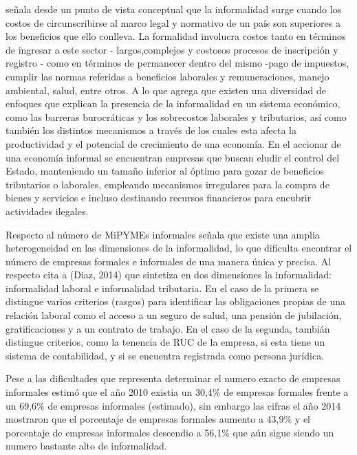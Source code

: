 \cite{loayza} se\~nala desde un punto de vista conceptual que la informalidad surge
cuando los costos de circunscribirse al marco legal y normativo de un pa\'is son
superiores a los beneficios que ello conlleva. La formalidad involucra costos
tanto en t\'erminos de ingresar a este sector - largos,complejos y costosos procesos
de inscripci\'on y registro - como en t\'erminos de permanecer dentro del mismo -pago
de impuestos, cumplir las normas referidas a beneficios laborales
y remuneraciones, manejo ambiental, salud, entre otros. A lo que \citep{penaranda}
agrega que existen una diversidad de enfoques que explican la presencia de la
informalidad en un sistema econ\'omico, como las barreras burocr\'aticas y los sobrecostos
laborales y tributarios, as\'i como tambi\'en los distintos mecanismos a trav\'es de
los cuales esta afecta la productividad y el potencial de crecimiento de una
econom\'ia. En el accionar de una econom\'ia informal se encuentran empresas que
buscan eludir el control del Estado, manteniendo un tama\~no inferior al \'optimo
para gozar de beneficios tributarios o laborales, empleando mecanismos irregulares
para la compra de bienes y servicios e incluso destinando recursos financieros
para encubrir actividades ilegales.

Respecto al n\'umero de MiPYMEs informales \cite{produce2} se\~nala que existe una
amplia heterogeneidad en las dimensiones de la informalidad, lo que dificulta
encontrar el n\'umero de empresas formales e informales de una manera \'unica y precisa.
Al respecto \citep{produce2} cita a (Diaz, 2014) que sintetiza en dos dimensiones
la informalidad: informalidad laboral e informalidad tributaria. En el caso de la
primera se distingue varios criterios (rasgos) para identificar las obligaciones
propias de una relaci\'on laboral como el acceso a un seguro de salud, una pensi\'on
de jubilaci\'on, gratificaciones y a un contrato de trabajo. En el caso de la segunda,
tambi\'an distingue criterios, como la tenencia de RUC de la empresa, si esta tiene
un sistema de contabilidad, y si se encuentra registrada como persona jur\'idica.

Pese a las dificultades que representa determinar el numero exacto de empresas
informales \cite{produce2} estim\'o que el a\~no 2010 existia un 30,4\% de empresas
formales frente a un 69,6\% de empresas informales (estimado), sin embargo las
cifras el a\~no 2014 mostraron que el porcentaje de empresas formales aumento a 43,9\%
y el porcentaje de empresas informales descendio a 56,1\% que a\'un sigue siendo
un numero bastante alto de informalidad.

